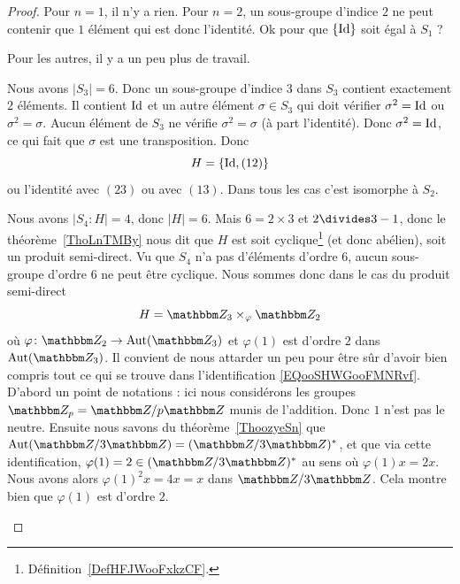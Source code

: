 \begin{proof}
    Pour \( n=1\), il n'y a rien. Pour \( n=2\), un sous-groupe d'indice \( 2\) ne peut contenir que \( 1\) élément qui est donc l'identité. Ok pour que \( \{ \operatorname{Id} \}\) soit égal à \( S_1\) ?

    Pour les autres, il y a un peu plus de travail.

    \begin{subproof}
        \item[Pour \( n=3\)]

            Nous avons \( | S_3 |=6\). Donc un sous-groupe d'indice $3$ dans \( S_3\) contient exactement \( 2\) éléments. Il contient \( \operatorname{Id}\) et un autre élément \( \sigma\in S_3\) qui doit vérifier \( \sigma^2=\operatorname{Id}\) ou \( \sigma^2=\sigma\). Aucun élément de \( S_3\) ne vérifie \( \sigma^2=\sigma\) (à part l'identité). Donc \( \sigma^2=\operatorname{Id}\), ce qui fait que \( \sigma\) est une transposition. Donc
            \begin{equation}
                H=\{ \operatorname{Id},(12) \}
            \end{equation}
            ou l'identité avec \( (23)\) ou avec \( (13)\). Dans tous les cas c'est isomorphe à \( S_2\).

        \item[Pour \( n=4\)]

            Nous avons \( | S_4:H |=4\), donc \( | H |=6\). Mais \( 6=2\times 3\) et \( 2\divides 3-1\), donc le théorème~\ref{ThoLnTMBy} nous dit que \( H\) est soit cyclique\footnote{Définition~\ref{DefHFJWooFxkzCF}.} (et donc abélien), soit un produit semi-direct. Vu que \( S_4\) n'a pas d'éléments d'ordre $6$, aucun sous-groupe d'ordre \( 6\) ne peut être cyclique. Nous sommes donc dans le cas du produit semi-direct
            \begin{equation}        \label{EQooSHWGooFMNRvf}
                H=\eZ_3\times_{\varphi}\eZ_2
            \end{equation}
            où \( \varphi\colon \eZ_2\to \Aut(\eZ_3)\) et \( \varphi(1)\) est d'ordre \( 2\) dans \( \Aut(\eZ_3)\). Il convient de nous attarder un peu pour être sûr d'avoir bien compris tout ce qui se trouve dans l'identification \eqref{EQooSHWGooFMNRvf}. D'abord un point de notations : ici nous considérons les groupes \( \eZ_p=\eZ/p\eZ\) munis de l'addition. Donc \( 1\) n'est pas le neutre. Ensuite nous savons du théorème~\ref{ThoozyeSn} que \( \Aut(\eZ/3\eZ)=(\eZ/3\eZ)^*\), et que via cette identification, \( \varphi(1)=2\in(\eZ/3\eZ)^*\) au sens où \( \varphi(1)x=2x\). Nous avons alors \( \varphi(1)^2x=4x=x\) dans \( \eZ/3\eZ\). Cela montre bien que \( \varphi(1)\) est d'ordre \( 2\).


\end{subproof}
\end{proof}
